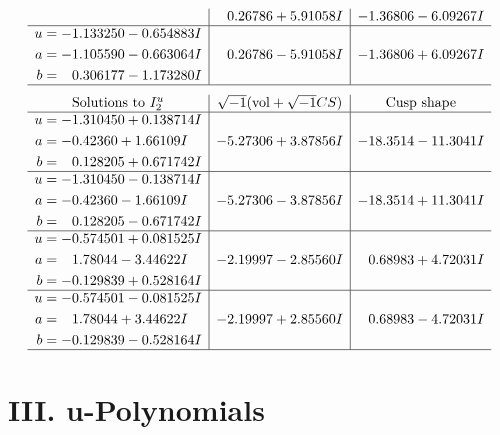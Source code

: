 \documentclass[1p]{elsarticle_modified}
\theoremstyle{definition}
\newcommand{\I}{\sqrt{-1}}
\begin{document}
$$\begin{array}{c|c|c}
 & \phantom{-}0.26786 + 5.91058 I & -1.36806 - 6.09267 I \\ \hline\begin{aligned}
u &= -1.133250 - 0.654883 I \\
a &= -1.105590 - 0.663064 I \\
b &= \phantom{-}0.306177 - 1.173280 I\end{aligned}
 & \phantom{-}0.26786 - 5.91058 I & -1.36806 + 6.09267 I\\
 \hline 
 \end{array}$$\newpage$$\begin{array}{c|c|c}  
\text{Solutions to }I^u_{2}& \I (\text{vol} + \sqrt{-1}CS) & \text{Cusp shape}\\
 \hline 
\begin{aligned}
u &= -1.310450 + 0.138714 I \\
a &= -0.42360 + 1.66109 I \\
b &= \phantom{-}0.128205 + 0.671742 I\end{aligned}
 & -5.27306 + 3.87856 I & -18.3514 - 11.3041 I \\ \hline\begin{aligned}
u &= -1.310450 - 0.138714 I \\
a &= -0.42360 - 1.66109 I \\
b &= \phantom{-}0.128205 - 0.671742 I\end{aligned}
 & -5.27306 - 3.87856 I & -18.3514 + 11.3041 I \\ \hline\begin{aligned}
u &= -0.574501 + 0.081525 I \\
a &= \phantom{-}1.78044 - 3.44622 I \\
b &= -0.129839 + 0.528164 I\end{aligned}
 & -2.19997 - 2.85560 I & \phantom{-}0.68983 + 4.72031 I \\ \hline\begin{aligned}
u &= -0.574501 - 0.081525 I \\
a &= \phantom{-}1.78044 + 3.44622 I \\
b &= -0.129839 - 0.528164 I\end{aligned}
 & -2.19997 + 2.85560 I & \phantom{-}0.68983 - 4.72031 I\\
 \hline 
 \end{array}$$\newpage
\newpage\renewcommand{\arraystretch}{1}
\centering \section*{ III. u-Polynomials}
\end{document}
